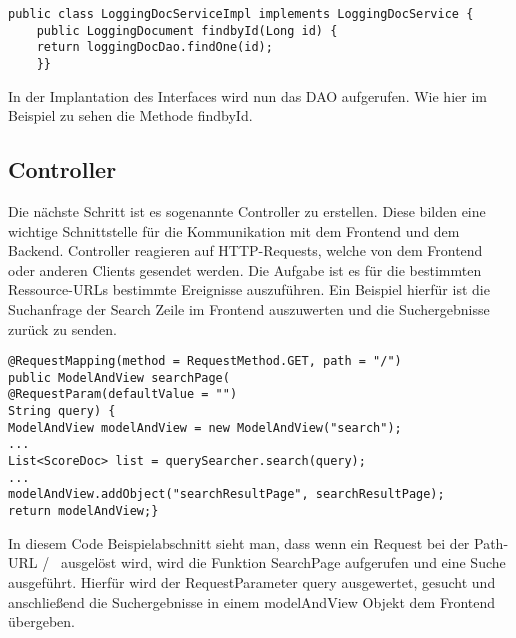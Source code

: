 \begin{lstlisting}
public class LoggingDocServiceImpl implements LoggingDocService {
	public LoggingDocument findbyId(Long id) {
	return loggingDocDao.findOne(id);
	}}
\end{lstlisting}

In der Implantation des Interfaces wird nun das DAO aufgerufen.
Wie hier im Beispiel zu sehen die Methode findbyId.

\subsection{Controller}
Die nächste Schritt ist es sogenannte Controller zu erstellen.
Diese bilden eine wichtige Schnittstelle für die Kommunikation mit dem Frontend und dem Backend.
Controller reagieren auf HTTP-Requests, welche von dem Frontend oder anderen Clients gesendet werden.
Die Aufgabe ist es für die bestimmten Ressource-URLs bestimmte Ereignisse auszuführen.
Ein Beispiel hierfür ist die Suchanfrage der Search Zeile im Frontend auszuwerten und die Suchergebnisse zurück zu senden.
\begin{lstlisting}
@RequestMapping(method = RequestMethod.GET, path = "/")
public ModelAndView searchPage(
@RequestParam(defaultValue = "")
String query) {
ModelAndView modelAndView = new ModelAndView("search");
...
List<ScoreDoc> list = querySearcher.search(query);
...
modelAndView.addObject("searchResultPage", searchResultPage);
return modelAndView;}
\end{lstlisting}

In diesem Code Beispielabschnitt sieht man, dass wenn ein Request bei der Path-URL \glqq/\grqq~ ausgelöst wird, wird die Funktion SearchPage aufgerufen und eine Suche ausgeführt.
Hierfür wird der RequestParameter query ausgewertet, gesucht und anschließend die Suchergebnisse in einem modelAndView Objekt dem Frontend übergeben. 











